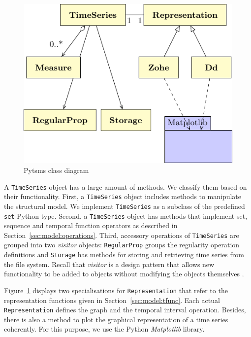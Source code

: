\begin{figure}[tp]
  \centering
  \includegraphics{fig_pytsms_uml.pdf}
  \caption{Pytsms  class diagram}
  \label{fig:implementacio:pytsms-uml}
\end{figure}

A \texttt{TimeSeries} object has a large amount of methods. We
classify them based on their functionality. First, a
\texttt{TimeSeries} object includes methods to manipulate the
structural model. We implement \texttt{TimeSeries} as a subclass of
the predefined \texttt{set} Python type. Second, a \texttt{TimeSeries}
object has methods that implement set, sequence and temporal function
operators as described in Section~\ref{sec:model:operations}.  Third,
accessory operations of \texttt{TimeSeries} are grouped into two
\emph{visitor} objects: \texttt{RegularProp} groups the regularity
operation definitions and \texttt{Storage} has methods for storing and
retrieving time series from the file system. Recall that
\emph{visitor} is a design pattern that allows new functionality to be
added to objects without modifying the objects themselves
\cite{ziade08:expert_python_programming:visitor,martin02:visitor}.

Figure~\ref{fig:implementacio:pytsms-uml} displays two specialisations
for \texttt{Representation} that refer to the representation functions
given in Section~\ref{sec:model:tfunc}. Each actual
\texttt{Representation} defines the graph and the temporal interval
operation. Besides, there is also a method to plot the graphical
representation of a time series coherently. For this purpose, we use
the Python \emph{Matplotlib} library.

